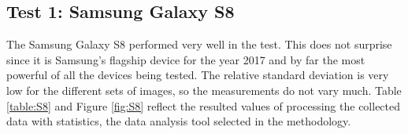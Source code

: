 \subsection{Test 1: Samsung Galaxy S8}
The Samsung Galaxy S8 performed very well in the test. This does not surprise since it is Samsung's flagship device for the year 2017 and by far the most powerful of all the devices being tested. The relative standard deviation is very low for the different sets of images, so the measurements do not vary much. Table \ref{table:S8} and Figure \ref{fig:S8} reflect the resulted values of processing the collected data with statistics, the data analysis tool selected in the methodology. \\

\begin{table}[h!]
\centering
{}
\caption{Samsung Galaxy S8 test results}
\label{table:S8}
\end{table}

